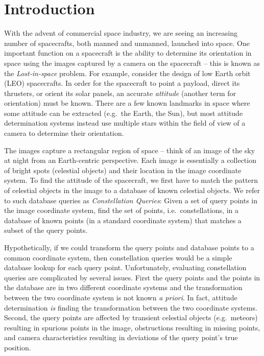 \newcommand{\imageset}{\texttt{IMG}}
\newcommand{\databaseset}{\texttt{DB}}
\newcommand{\imagesubset}{b}
\newcommand{\databasesubset}{R}
\newcommand{\candidateset}{r}
\newcommand{\solutionmap}{h}

\newcommand{\genericdatabase}{\texttt{X\_DB}}
\newcommand{\angdatabase}{\texttt{ANG\_DB}}
\newcommand{\dotdatabase}{\texttt{DOT\_DB}}
\newcommand{\intdatabase}{\texttt{INT\_DB}}
\newcommand{\sphdatabase}{\texttt{SPH\_DB}}
\newcommand{\plndatabase}{\texttt{PLN\_DB}}
\newcommand{\pyrdatabase}{\texttt{PYR\_DB}}
\newcommand{\comdatabase}{\texttt{COM\_DB}}

\section{Introduction}\label{sec:introduction}
With the advent of commercial space industry, we are seeing an increasing number of spacecrafts, both manned and unmanned, launched into space.
One important function on a spacecraft is the ability to determine its orientation in space using the images captured by a camera on the spacecraft -- this is known as the \textit{Lost-in-space} problem.
For example, consider the design of low Earth orbit (LEO) spacecrafts.
In order for the spacecraft to point a payload, direct its thrusters, or orient its solar panels, an accurate \textit{attitude} (another term for orientation) must be known.
There are a few known landmarks in space where some attitude can be extracted (e.g.\ the Earth, the Sun), but most attitude determination systems instead use multiple stars within the field of view of a camera to determine their orientation.

The images capture a rectangular region of space -- think of an image of the sky at night from an Earth-centric perspective.
Each image is essentially a collection of bright spots (celestial objects) and their location in the image coordinate system.
To find the attitude of the spacecraft, we first have to match the pattern of celestial objects in the image to a database of known celestial objects.
We refer to such database queries as \textit{Constellation Queries}:
Given a set of query points in the image coordinate system, find the set of
points, i.e.\ constellations, in a database of known points (in a standard
coordinate system) that matches a subset of the query points.

Hypothetically, if we could transform the query points and database points to a
common coordinate system, then constellation queries would be a simple database
lookup for each query point. Unfortunately, evaluating constellation queries
are complicated by several issues. First the query points and the points in the
database are in two different coordinate systems and the transformation between
the two coordinate system is not known \emph{a priori}.
In fact, attitude determination \emph{is} finding the transformation between the two coordinate systems.
Second, the query points are affected by transient celestial objects (e.g.\ meteors) resulting in spurious points in the image, obstructions resulting in missing points, and camera characteristics resulting in deviations of the query point's true position.

